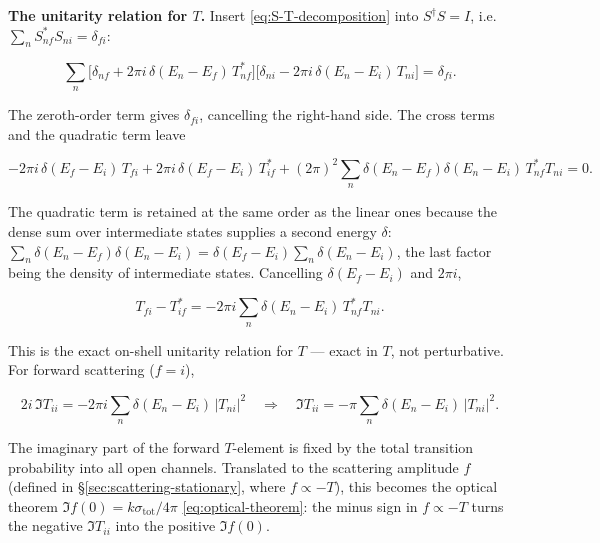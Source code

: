 \medskip\noindent\textbf{The unitarity relation for $T$.} Insert \eqref{eq:S-T-decomposition} into $S^{\dagger}S=I$, i.e.\ $\sum_{n}S_{nf}^{*}S_{ni}=\delta_{fi}$:
\begin{linenomath}
\begin{equation*}
\sum_{n}\bigl[\delta_{nf}+2\pi i\,\delta(E_{n}-E_{f})\,T_{nf}^{*}\bigr]\bigl[\delta_{ni}-2\pi i\,\delta(E_{n}-E_{i})\,T_{ni}\bigr]=\delta_{fi}.
\end{equation*}
\end{linenomath}
The zeroth-order term gives $\delta_{fi}$, cancelling the right-hand side. The cross terms and the quadratic term leave
\begin{linenomath}
\begin{equation*}
-2\pi i\,\delta(E_{f}-E_{i})\,T_{fi} + 2\pi i\,\delta(E_{f}-E_{i})\,T_{if}^{*} + (2\pi)^{2}\sum_{n}\delta(E_{n}-E_{f})\delta(E_{n}-E_{i})\,T_{nf}^{*}T_{ni} = 0.
\end{equation*}
\end{linenomath}
The quadratic term is retained at the same order as the linear ones because the dense sum over intermediate states supplies a second energy $\delta$:
$\sum_{n}\delta(E_{n}-E_{f})\delta(E_{n}-E_{i}) = \delta(E_{f}-E_{i})\sum_{n}\delta(E_{n}-E_{i})$,
the last factor being the density of intermediate states. Cancelling $\delta(E_{f}-E_{i})$ and $2\pi i$,
\begin{linenomath}
\begin{equation}
T_{fi} - T_{if}^{*} = -2\pi i\sum_{n}\delta(E_{n}-E_{i})\,T_{nf}^{*}T_{ni}.
\label{eq:T-unitarity}
\end{equation}
\end{linenomath}
This is the exact on-shell unitarity relation for $T$ --- exact in $T$, not perturbative. For forward scattering ($f=i$),
\begin{linenomath}
\begin{equation*}
2i\,\Im T_{ii} = -2\pi i\sum_{n}\delta(E_{n}-E_{i})\,|T_{ni}|^{2}
\quad\Longrightarrow\quad
\Im T_{ii} = -\pi\sum_{n}\delta(E_{n}-E_{i})\,|T_{ni}|^{2}.
\end{equation*}
\end{linenomath}
The imaginary part of the forward $T$-element is fixed by the total transition probability into all open channels. Translated to the scattering amplitude $f$ (defined in \S\ref{sec:scattering-stationary}, where $f\propto -T$), this becomes the optical theorem $\Im f(0)=k\sigma_{\mathrm{tot}}/4\pi$ \eqref{eq:optical-theorem}: the minus sign in $f\propto -T$ turns the negative $\Im T_{ii}$ into the positive $\Im f(0)$.

